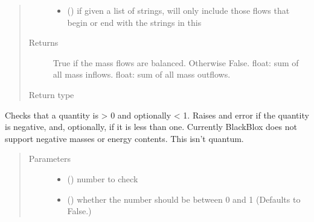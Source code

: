 \documentclass[a4paper,10pt,english]{sphinxmanual}
\begin{document}
\begin{fulllineitems}
\begin{quote}
\begin{description}
\begin{itemize}
\item {} 
 () \textendash{} if given a list of strings, will only
include those flows that begin or end with the strings in this

\end{itemize}

\item[{Returns}] \leavevmode
True if the mass flows are balanced. Otherwise False.
float: sum of all mass inflows.
float: sum of all mass outflows.

\item[{Return type}] \leavevmode
{}

\end{description}\end{quote}

\end{fulllineitems}


\begin{fulllineitems}
\label{\detokenize{calculators:calculators.check_qty}}
Checks that a quantity is \textgreater{} 0 and optionally \textless{} 1.
Raises and error if the quantity is negative, and, optionally, if it is
less than one. Currently BlackBlox does not support negative masses or
energy contents. This isn’t quantum.
\begin{quote}\begin{description}
\item[{Parameters}] \leavevmode\begin{itemize}
\item {} 
 () \textendash{} number to check

\item {} 
 () \textendash{} whether the number should be between 0 and 1
(Defaults to False.)

\end{itemize}

\end{description}\end{quote}

\end{fulllineitems}
\end{document}
